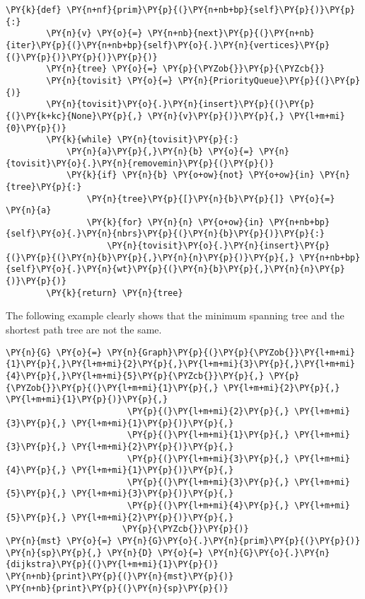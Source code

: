 \begin{Verbatim}[commandchars=\\\{\}]
    \PY{k}{def} \PY{n+nf}{prim}\PY{p}{(}\PY{n+nb+bp}{self}\PY{p}{)}\PY{p}{:}
        \PY{n}{v} \PY{o}{=} \PY{n+nb}{next}\PY{p}{(}\PY{n+nb}{iter}\PY{p}{(}\PY{n+nb+bp}{self}\PY{o}{.}\PY{n}{vertices}\PY{p}{(}\PY{p}{)}\PY{p}{)}\PY{p}{)}
        \PY{n}{tree} \PY{o}{=} \PY{p}{\PYZob{}}\PY{p}{\PYZcb{}}
        \PY{n}{tovisit} \PY{o}{=} \PY{n}{PriorityQueue}\PY{p}{(}\PY{p}{)}
        \PY{n}{tovisit}\PY{o}{.}\PY{n}{insert}\PY{p}{(}\PY{p}{(}\PY{k+kc}{None}\PY{p}{,} \PY{n}{v}\PY{p}{)}\PY{p}{,} \PY{l+m+mi}{0}\PY{p}{)}
        \PY{k}{while} \PY{n}{tovisit}\PY{p}{:}
            \PY{n}{a}\PY{p}{,}\PY{n}{b} \PY{o}{=} \PY{n}{tovisit}\PY{o}{.}\PY{n}{removemin}\PY{p}{(}\PY{p}{)}
            \PY{k}{if} \PY{n}{b} \PY{o+ow}{not} \PY{o+ow}{in} \PY{n}{tree}\PY{p}{:}
                \PY{n}{tree}\PY{p}{[}\PY{n}{b}\PY{p}{]} \PY{o}{=} \PY{n}{a}
                \PY{k}{for} \PY{n}{n} \PY{o+ow}{in} \PY{n+nb+bp}{self}\PY{o}{.}\PY{n}{nbrs}\PY{p}{(}\PY{n}{b}\PY{p}{)}\PY{p}{:}
                    \PY{n}{tovisit}\PY{o}{.}\PY{n}{insert}\PY{p}{(}\PY{p}{(}\PY{n}{b}\PY{p}{,}\PY{n}{n}\PY{p}{)}\PY{p}{,} \PY{n+nb+bp}{self}\PY{o}{.}\PY{n}{wt}\PY{p}{(}\PY{n}{b}\PY{p}{,}\PY{n}{n}\PY{p}{)}\PY{p}{)}
        \PY{k}{return} \PY{n}{tree}
\end{Verbatim}



The following example clearly shows that the minimum spanning tree and the shortest path tree are not the same.

\begin{Verbatim}[commandchars=\\\{\}]
\PY{n}{G} \PY{o}{=} \PY{n}{Graph}\PY{p}{(}\PY{p}{\PYZob{}}\PY{l+m+mi}{1}\PY{p}{,}\PY{l+m+mi}{2}\PY{p}{,}\PY{l+m+mi}{3}\PY{p}{,}\PY{l+m+mi}{4}\PY{p}{,}\PY{l+m+mi}{5}\PY{p}{\PYZcb{}}\PY{p}{,} \PY{p}{\PYZob{}}\PY{p}{(}\PY{l+m+mi}{1}\PY{p}{,} \PY{l+m+mi}{2}\PY{p}{,} \PY{l+m+mi}{1}\PY{p}{)}\PY{p}{,}
                        \PY{p}{(}\PY{l+m+mi}{2}\PY{p}{,} \PY{l+m+mi}{3}\PY{p}{,} \PY{l+m+mi}{1}\PY{p}{)}\PY{p}{,}
                        \PY{p}{(}\PY{l+m+mi}{1}\PY{p}{,} \PY{l+m+mi}{3}\PY{p}{,} \PY{l+m+mi}{2}\PY{p}{)}\PY{p}{,}
                        \PY{p}{(}\PY{l+m+mi}{3}\PY{p}{,} \PY{l+m+mi}{4}\PY{p}{,} \PY{l+m+mi}{1}\PY{p}{)}\PY{p}{,}
                        \PY{p}{(}\PY{l+m+mi}{3}\PY{p}{,} \PY{l+m+mi}{5}\PY{p}{,} \PY{l+m+mi}{3}\PY{p}{)}\PY{p}{,}
                        \PY{p}{(}\PY{l+m+mi}{4}\PY{p}{,} \PY{l+m+mi}{5}\PY{p}{,} \PY{l+m+mi}{2}\PY{p}{)}\PY{p}{,}
                       \PY{p}{\PYZcb{}}\PY{p}{)}
\PY{n}{mst} \PY{o}{=} \PY{n}{G}\PY{o}{.}\PY{n}{prim}\PY{p}{(}\PY{p}{)}
\PY{n}{sp}\PY{p}{,} \PY{n}{D} \PY{o}{=} \PY{n}{G}\PY{o}{.}\PY{n}{dijkstra}\PY{p}{(}\PY{l+m+mi}{1}\PY{p}{)}
\PY{n+nb}{print}\PY{p}{(}\PY{n}{mst}\PY{p}{)}
\PY{n+nb}{print}\PY{p}{(}\PY{n}{sp}\PY{p}{)}
\end{Verbatim}



